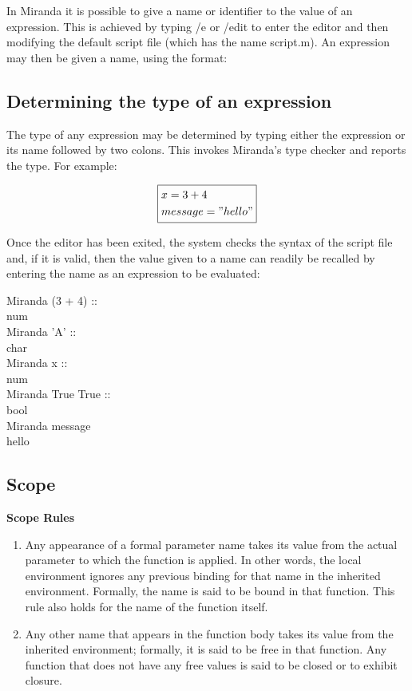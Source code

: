 \documentclass[11pt]{article}
\begin{document}
In Miranda it is possible to give a name or identifier to the  value of an expression. This is achieved by typing /e or /edit to enter the editor and then modifying the default script file (which has the name script.m). 
An expression may then be given a name, using the format:
\subsection{Determining the type of an expression}
The type of any expression may be determined by typing either the expression or its name followed by two colons. This invokes Miranda’s type checker and reports the type. For example:

\[
\boxed{
\begin{aligned}
  & x = 3+4\\
  & message = "hello"
\end{aligned}
}
\]

Once the editor has been exited, the system checks the syntax of the script file
and, if it is valid, then the value given to a name can readily be recalled by entering
the name as an expression to be evaluated:

\begin{tcolorbox}
Miranda (3 + 4) ::\\
num\\


Miranda ’A’ ::\\
char\\


Miranda x ::\\
num\\

Miranda True \/ True ::\\
bool\\

Miranda message\\
hello
\end{tcolorbox}

\subsection{Scope}
\textbf{Scope Rules}
\begin{enumerate}

    \item Any appearance of a formal parameter name takes its value from the actual parameter to which the function is applied. In other words, the local environment ignores any previous binding for that name in the inherited environment. Formally, the name is said to be bound in that function. This rule also holds for the name of the function itself.
    \item Any other name that appears in the function body takes its value from the inherited environment; formally, it is said to be free in that function. Any function that does not have any free values is said to be closed or to exhibit closure. 
    
\end{enumerate}
\end{document}
